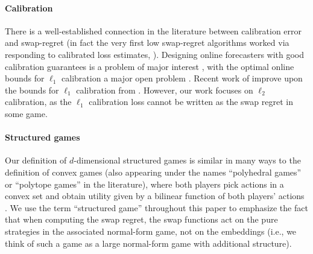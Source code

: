 \paragraph{Calibration} There is a well-established connection in the literature between calibration error and swap-regret \citep{cesa2006prediction} (in fact the very first low swap-regret algorithms worked via responding to calibrated loss estimates, \cite{foster1997calibrated}). Designing online forecasters with good calibration guarantees is a problem of major interest \citep{brier1950verification,murphy1972scalar,murphy1973new,foster1998asymptotic, kleinberg2023u, gopalan2022omnipredictors}, with the optimal online bounds for $\ell_1$ calibration a major open problem \citep{qiao2021stronger}. Recent work of \cite{dagan2024breakingt23barriersequential} improve upon the bounds for $\ell_1$ calibration from \cite{qiao2021stronger}. However, our work focuses on $\ell_2$ calibration, as the $\ell_1$ calibration loss cannot be written as the swap regret in some game. 

\paragraph{Structured games} Our definition of $d$-dimensional structured games is similar in many ways to the definition of convex games (also appearing under the names ``polyhedral games'' or ``polytope games'' in the literature), where both players pick actions in a convex set and obtain utility given by a bilinear function of both players' actions \citep{GordonGreenwaldMarks2008, chakrabarti2024efficient, mansour2022strategizing}. We use the term ``structured game'' throughout this paper to emphasize the fact that when computing the swap regret, the swap functions act on the pure strategies in the associated normal-form game, not on the embeddings (i.e., we think of such a game as a large normal-form game with additional structure).